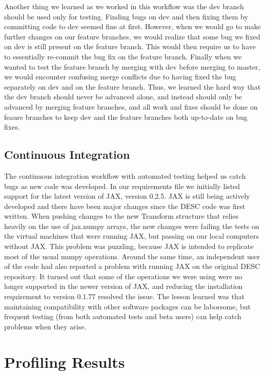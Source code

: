 \documentclass{article}
\begin{document}
Another thing we learned as we worked in this workflow was the dev branch should be used only for testing.
Finding bugs on dev and then fixing them by committing code to dev seemed fine at first.
However, when we would go to make further changes on our feature branches, we would realize that some bug we fixed on dev is still present on the feature branch.
This would then require us to have to essentially re-commit the bug fix on the feature branch.
Finally when we wanted to test the feature branch by merging with dev before merging to master, we would encounter confusing merge conflicts due to having fixed the bug separately on dev and on the feature branch.
Thus, we learned the hard way that the dev branch should never be advanced alone, and instead should only be advanced by merging feature branches, and all work and fixes should be done on feaure branches to keep dev and the feature branches both up-to-date on bug fixes.

\subsection{Continuous Integration}

The continuous integration workflow with automated testing helped us catch bugs as new code was developed.
In our requirements file we initially listed support for the latest version of JAX, version 0.2.5.
JAX is still being actively developed and there have been major changes since the DESC code was first written.
When pushing changes to the new Transform structure that relies heavily on the use of jax.numpy arrays, the new changes were failing the tests on the virtual machines that were running JAX, but passing on our local computers without JAX.
This problem was puzzling, because JAX is intended to replicate most of the usual numpy operations.
Around the same time, an independent user of the code had also reported a problem with running JAX on the original DESC repository.
It turned out that some of the operations we were using were no longer supported in the newer version of JAX, and reducing the installation requirement to version 0.1.77 resolved the issue.
The lesson learned was that maintaining compatibility with other software packages can be laborsome, but frequent testing (from both automated tests and beta users) can help catch problems when they arise.


\section{Profiling Results}
\end{document}
